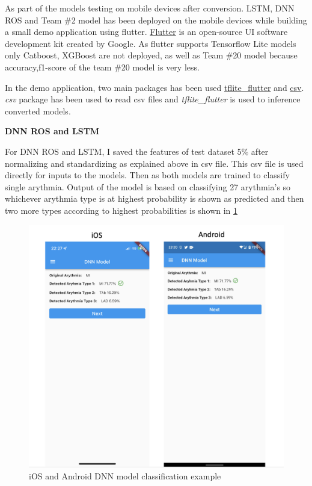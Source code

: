 As part of the models testing on mobile devices after conversion. LSTM, DNN ROS and Team \#2 model has been deployed on the mobile devices while building a small demo application using flutter. \href{https://flutter.dev/}{Flutter} is an open-source UI software development kit created by Google. As flutter supports Tensorflow Lite models only Catboost, XGBoost are not deployed, as well as Team \#20 model because accuracy,f1-score of the team \#20 model is very less. 

In the demo application, two main packages has been used \href{https://pub.dev/packages/tflite\_flutter}{tflite\_flutter} and \href{https://pub.dev/packages/csv}{csv}. \textit{csv} package has been used to read csv files and \textit{tflite\_flutter} is used to inference converted models. 

\textbf{DNN ROS and LSTM}

For DNN ROS and LSTM, I saved the features of test dataset 5\% after normalizing and standardizing as explained above in csv file. This csv file is used directly for inputs to the models. Then as both models are trained to classify single arythmia. Output of the model is based on classifying 27 arythmia's so whichever arythmia type is at highest probability is shown as predicted and then two more types according to highest probabilities is shown in \ref{dnn_deloyment} 


\begin{figure}[H]
\centering
\includegraphics[scale=0.4]{img/dnn_deloyment.png}
\caption{iOS and Android DNN model classification example}
\label{dnn_deloyment}
\end{figure}

